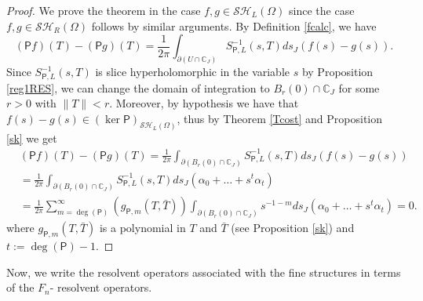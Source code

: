 \documentclass[reqno,11pt]{amsart}
\numberwithin{equation}{section}
\theoremstyle{definition}
\newcommand{\cc}{\mathbb{C}}
\begin{document}
\begin{proof}
	We prove the theorem in the case $f,g\in \mathcal{SH}_L(\Omega)$ since the case $f,g\in\mathcal{SH}_R(\Omega)$ follows by similar arguments. By Definition \ref{fcalc}, we have
	$$
	(\mathsf P f)(T)-(\mathsf Pg)(T)=\frac 1{2\pi}\int_{\partial (U\cap\cc_J)}S_{\mathsf P,L}^{-1}(s,T)ds_J(f(s)-g(s)).
	$$
	Since $S_{\mathsf P,L}^{-1}(s,T)$ is slice hyperholomorphic in the variable $s$ by Proposition \ref{reg1RES}, we can change the domain of integration to $B_r(0)\cap\cc_J$ for some $r>0$ with $ \| T \| <r$. Moreover, by hypothesis we have that $f(s)-g(s) \in (\ker{\mathsf P})_{\mathcal{SH}_L(\Omega)}$, thus by Theorem \ref{Tcost} and Proposition \ref{sk} we get
	\[
	\begin{split}
		&(\mathsf Pf)(T)-(\mathsf Pg)(T)=\frac 1{2\pi}\int_{\partial (B_r(0)\cap\cc_J)} S^{-1}_{\mathsf P,L}(s,T)ds_J(f(s)-g(s))
		\\
		&
		=\frac 1{2\pi}\int_{\partial (B_r(0)\cap\cc_J)} S^{-1}_{\mathsf P,L}(s,T) ds_J(\alpha_0+\dots+s^t\alpha_t)\\
		&= \frac 1{2\pi} \sum_{m=\operatorname{deg}(\mathsf P)}^\infty\left(g_{\mathsf P,m}(T,\bar T)\right) \int_{\partial (B_r(0)\cap \cc_J)}s^{-1-m} ds_J (\alpha_0+\dots+s^t\alpha_t)=0.
	\end{split}
	\]
	where $g_{\mathsf P,m}(T,\bar T)$ is a polynomial in $T$ and $\bar T$ (see Proposition \ref{sk}) and $t:=\operatorname{deg}(\mathsf P)-1$.
\end{proof}
Now, we write the resolvent operators associated with the fine structures in terms of the $F_n$- resolvent operators.
\end{document}
